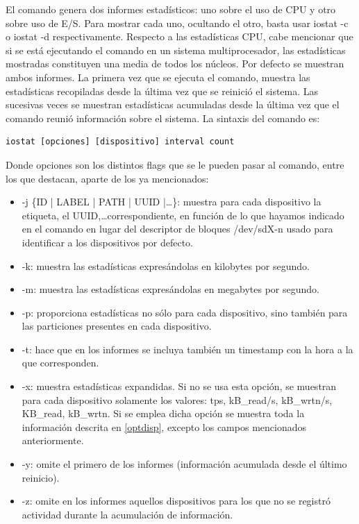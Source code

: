 \documentclass[a4paper,10pt]{article}
\renewcommand{\texttt}[2][black!60]{\textcolor{#1}{\ttfamily #2}}
\begin{document}
El comando genera dos informes estadísticos: uno sobre el uso de CPU y otro sobre uso de E/S. Para mostrar cada uno, ocultando
el otro, basta usar \texttt{iostat -c} o \texttt{iostat -d} respectivamente. Respecto a las estadísticas CPU, cabe mencionar
que si se está ejecutando el comando en un sistema multiprocesador, las estadísticas mostradas constituyen una media de todos
los núcleos. Por defecto se muestran ambos informes. La primera vez que se ejecuta el comando, muestra las estadísticas 
recopiladas desde la última vez que se reinició el sistema. Las sucesivas veces se muestran estadísticas acumuladas desde la
última vez que el comando reunió información sobre el sistema. La sintaxis del comando es:

  \begin{lstlisting}[style=BashInputStyle]
  iostat [opciones] [dispositivo] interval count
  \end{lstlisting}
  
  Donde \texttt{opciones} son los distintos flags que se le pueden pasar al comando, entre los que destacan, aparte de los ya
  mencionados:
  
  \begin{itemize}
   \item \texttt{-j \{ID | LABEL | PATH | UUID |\ldots\}}: muestra para cada dispositivo la etiqueta, el UUID,\ldots correspondiente,
   en función de lo que hayamos indicado en el comando en lugar del descriptor de bloques /dev/sdX-n usado para identificar a los dispositivos
   por defecto.
   \item \texttt{-k}: muestra las estadísticas expresándolas en kilobytes por segundo.
   \item \texttt{-m}: muestra las estadísticas expresándolas en megabytes por segundo.
   \item \texttt{-p}: proporciona estadísticas no sólo para cada dispositivo, sino también para las particiones presentes en cada
   dispositivo.
   \item \texttt{-t}: hace que en los informes se incluya también un timestamp con la hora a la que corresponden.
   \item \texttt{-x}: muestra estadísticas expandidas. Si no se usa esta opción, se muestran para cada dispositivo solamente
   los valores: \texttt{tps, kB\_read/s, kB\_wrtn/s, KB\_read, kB\_wrtn}. Si se emplea dicha opción se muestra toda la
   información descrita en \ref{optdisp}, excepto los campos mencionados anteriormente.
   \item \texttt{-y}: omite el primero de los informes (información acumulada desde el último reinicio).
   \item \texttt{-z}: omite en los informes aquellos dispositivos para los que no se registró actividad durante la acumulación
   de información.
  \end{itemize}
\end{document}

